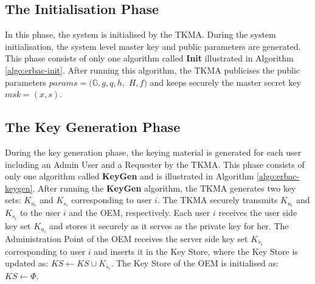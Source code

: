 \documentclass[epsfig,a4paper,11pt,titlepage]{book}
\numberwithin{algorithm}{chapter}
\begin{document}
\subsection{The Initialisation Phase}
In this phase, the system is initialised by the \gls{TKMA}. During the system initialisation, the system level master key and public parameters are generated. This phase consists of only one algorithm called \textbf{Init} illustrated in Algorithm \ref{algo:erbac-init}. After running this algorithm, the \gls{TKMA} publicises the public parameters $params = (\mathbb{G}, g, q, h,$ $H, f)$ and keeps securely the master secret key $msk = (x, s)$.

\subsection{The Key Generation Phase}
During the key generation phase, the keying material is generated for each user including an Admin User and a Requester by the \gls{TKMA}. This phase consists of only one algorithm called \textbf{KeyGen} and is illustrated in Algorithm \ref{algo:erbac-keygen}. After running the \textbf{KeyGen} algorithm, the \gls{TKMA} generates two key sets: $K_{u_i}$ and $K_{s_i}$ corresponding to user $i$. The \gls{TKMA} securely transmits $K_{u_i}$ and $K_{s_i}$ to the user $i$ and the \gls{OEM}, respectively. Each user $i$ receives the user side key set $K_{u_i}$ and stores it securely as it serves as the private key for her. The Administration Point of the \gls{OEM} receives the server side key set $K_{s_i}$ corresponding to user $i$ and inserts it in the Key Store, where the Key Store is updated as: $KS \leftarrow KS \cup K_{s_i}$. The Key Store of the \gls{OEM} is initialised as: $KS \leftarrow \Phi$.
\end{document}
